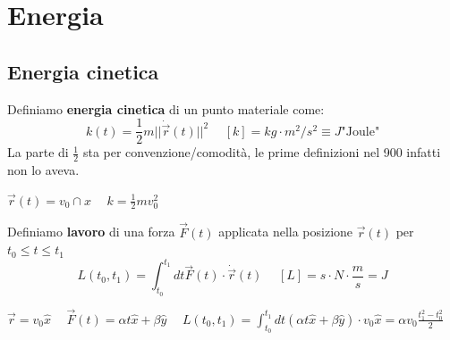 \newpage
\section{Energia}
\subsection{Energia cinetica}
Definiamo \textbf{energia cinetica} di un punto materiale come:
$$k(t) = \frac{1}{2}m||\dot{\vec{r}}(t)||^2 \hspace{15pt} [k] = kg \cdot m^2/s^2 \equiv J \text{"Joule"}$$
La parte di $\frac{1}{2}$ sta per convenzione/comodità, le prime definizioni nel 900 infatti non lo aveva.
\begin{example}
    $\vec{r}(t) = v_0 \cap{x} \hspace{15pt} k= \frac{1}{2}mv_0^2$
\end{example}
Definiamo \textbf{lavoro} di una forza $\vec{F}(t)$ applicata nella posizione $\vec{r}(t)$ per $t_0 \leq t \leq t_1$
$$L(t_0, t_1) = \int_{t_0}^{t_1}dt \vec{F}(t) \cdot \dot{\vec{r}}(t) \hspace{15pt} [L] = s \cdot N \cdot \frac{m}{s} = J$$
\begin{example}
    $\vec{r} = v_0 \hat{x} \hspace{15pt} \vec{F}(t) = \alpha t \hat{x} + \beta \hat{y} \hspace{15pt} L(t_0, t_1) = \int_{t_0}^{t_1} dt(\alpha t\hat{x} + \beta \hat{y}) \cdot v_0 \hat{x} = \alpha v_0 \frac{t_1^2 - t_0^2}{2}$
\end{example}


